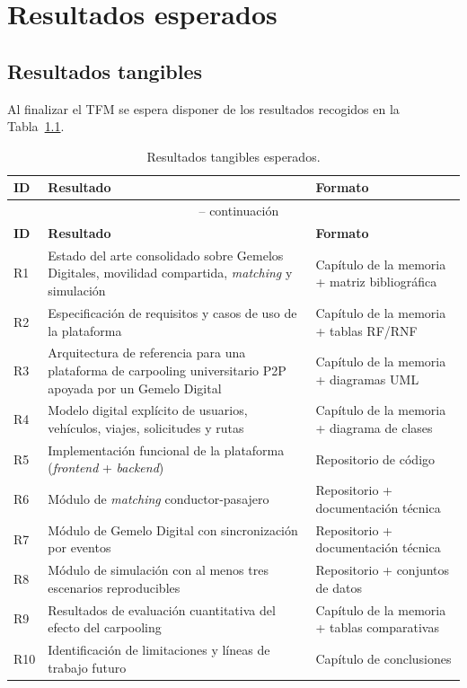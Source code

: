 
\chapter{Resultados esperados}
\label{ch:resultados-esperados}

\section{Resultados tangibles}

Al finalizar el TFM se espera disponer de los resultados recogidos en la Tabla~\ref{tab:resultados-tangibles}.

\begin{longtable}{p{1.1cm} p{8.4cm} p{5.14cm}}
  \caption{Resultados tangibles esperados.}
  \label{tab:resultados-tangibles}\\
  \hline
  \textbf{ID} & \textbf{Resultado} & \textbf{Formato} \\
  \hline
  \endfirsthead
  \multicolumn{3}{c}{\tablename\ \thetable{} -- continuación}\\
  \hline
  \textbf{ID} & \textbf{Resultado} & \textbf{Formato} \\
  \hline
  \endhead
  R1 & Estado del arte consolidado sobre Gemelos Digitales, movilidad compartida, \textit{matching} y simulación & Capítulo de la memoria + matriz bibliográfica \\
  R2 & Especificación de requisitos y casos de uso de la plataforma & Capítulo de la memoria + tablas RF/RNF \\
  R3 & Arquitectura de referencia para una plataforma de carpooling universitario P2P apoyada por un Gemelo Digital & Capítulo de la memoria + diagramas UML \\
  R4 & Modelo digital explícito de usuarios, vehículos, viajes, solicitudes y rutas & Capítulo de la memoria + diagrama de clases \\
  R5 & Implementación funcional de la plataforma (\textit{frontend} + \textit{backend}) & Repositorio de código \\
  R6 & Módulo de \textit{matching} conductor-pasajero & Repositorio + documentación técnica \\
  R7 & Módulo de Gemelo Digital con sincronización por eventos & Repositorio + documentación técnica \\
  R8 & Módulo de simulación con al menos tres escenarios reproducibles & Repositorio + conjuntos de datos \\
  R9 & Resultados de evaluación cuantitativa del efecto del carpooling & Capítulo de la memoria + tablas comparativas \\
  R10 & Identificación de limitaciones y líneas de trabajo futuro & Capítulo de conclusiones \\
  \hline
\end{longtable}

